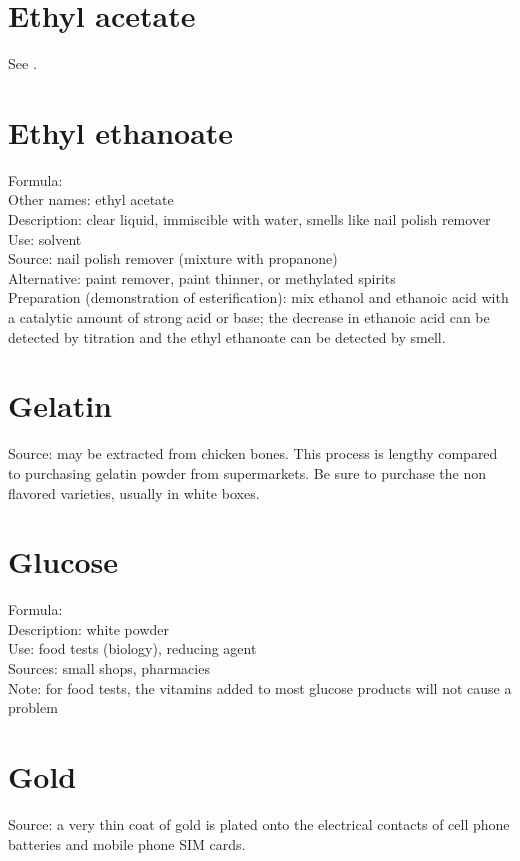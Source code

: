 \section{Ethyl acetate}
See .

\section{Ethyl ethanoate}
\label{sec:ethylethanoate}
Formula: \\
Other names: ethyl acetate\\
Description: clear liquid, 
immiscible with water, 
smells like nail polish remover\\
Use: solvent\\
Source: nail polish remover (mixture with propanone)\\
Alternative: paint remover, 
paint thinner, 
or methylated spirits\\
Preparation (demonstration of esterification): 
mix ethanol and ethanoic acid 
with a catalytic amount of strong acid or base; 
the decrease in ethanoic acid can be detected 
by titration and the ethyl ethanoate can be detected by smell.

\section{Gelatin}
Source: may be extracted from chicken bones. 
This process is lengthy compared 
to purchasing gelatin powder from supermarkets. 
Be sure to purchase the non flavored varieties, 
usually in white boxes.

\section{Glucose}
Formula: \\
Description: white powder\\
Use: food tests (biology), 
reducing agent\\
Sources: small shops, 
pharmacies\\
Note: for food tests, 
the vitamins added to most glucose products will not cause a problem

\section{Gold}
Source: a very thin coat of gold is plated 
onto the electrical contacts of cell phone batteries 
and mobile phone SIM cards.

